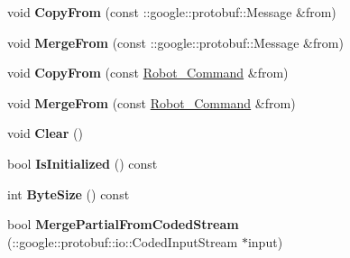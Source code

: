 \begin{DoxyCompactItemize}
\item 
void {\bfseries Copy\+From} (const \+::google\+::protobuf\+::\+Message \&from)\hypertarget{classvss__command_1_1Robot__Command_a44b1cba95f68eb9c9349d1f06b0567db}{}\label{classvss__command_1_1Robot__Command_a44b1cba95f68eb9c9349d1f06b0567db}

\item 
void {\bfseries Merge\+From} (const \+::google\+::protobuf\+::\+Message \&from)\hypertarget{classvss__command_1_1Robot__Command_a72b9a2f6e5fcb0ee33f5c1a5782bb655}{}\label{classvss__command_1_1Robot__Command_a72b9a2f6e5fcb0ee33f5c1a5782bb655}

\item 
void {\bfseries Copy\+From} (const \hyperlink{classvss__command_1_1Robot__Command}{Robot\+\_\+\+Command} \&from)\hypertarget{classvss__command_1_1Robot__Command_a98f8965b27b6495b2d59dccd8d2bfe19}{}\label{classvss__command_1_1Robot__Command_a98f8965b27b6495b2d59dccd8d2bfe19}

\item 
void {\bfseries Merge\+From} (const \hyperlink{classvss__command_1_1Robot__Command}{Robot\+\_\+\+Command} \&from)\hypertarget{classvss__command_1_1Robot__Command_a48c5d39a8a3d31209db79aa77fcf876f}{}\label{classvss__command_1_1Robot__Command_a48c5d39a8a3d31209db79aa77fcf876f}

\item 
void {\bfseries Clear} ()\hypertarget{classvss__command_1_1Robot__Command_aaffa12def3a1311252dcaccf6becb28b}{}\label{classvss__command_1_1Robot__Command_aaffa12def3a1311252dcaccf6becb28b}

\item 
bool {\bfseries Is\+Initialized} () const \hypertarget{classvss__command_1_1Robot__Command_af368ddcdb8103f40b21503727664fc52}{}\label{classvss__command_1_1Robot__Command_af368ddcdb8103f40b21503727664fc52}

\item 
int {\bfseries Byte\+Size} () const \hypertarget{classvss__command_1_1Robot__Command_a54599973bda6814c7842036eb9bf9229}{}\label{classvss__command_1_1Robot__Command_a54599973bda6814c7842036eb9bf9229}

\item 
bool {\bfseries Merge\+Partial\+From\+Coded\+Stream} (\+::google\+::protobuf\+::io\+::\+Coded\+Input\+Stream $\ast$input)\hypertarget{classvss__command_1_1Robot__Command_a471b2b99a1e476866bdb6ded82d46274}{}\label{classvss__command_1_1Robot__Command_a471b2b99a1e476866bdb6ded82d46274}


\end{DoxyCompactItemize}
